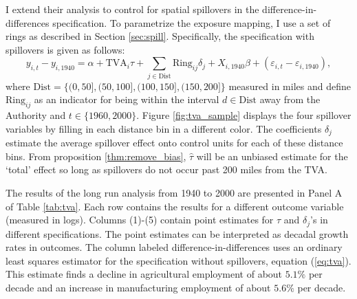 \documentclass[11pt]{article}
\begin{document}
I extend their analysis to control for spatial spillovers in the difference-in-differences specification. To parametrize the exposure mapping, I use a set of rings as described in Section \ref{sec:spill}. Specifically, 
the specification with spillovers is given as follows:  
\begin{equation}\label{eq:tva_spillover}
    y_{i, t} - y_{i, 1940} = \alpha + \text{TVA}_i \tau + \sum_{j \in \text{Dist}} \text{Ring}_{ij} \delta_j + X_{i, 1940} \beta + (\varepsilon_{i, t} - \varepsilon_{i, 1940}),
\end{equation} 
where $\text{Dist} = \{(0, 50], (50, 100], (100, 150], (150, 200]\}$ measured in miles and define $\text{Ring}_{ij}$ as an indicator for being within the interval $d \in \text{Dist}$ away from the Authority and $t \in \{1960, 2000\}$. Figure \ref{fig:tva_sample} displays the four spillover variables by filling in each distance bin in a different color. The coefficients $\delta_j$ estimate the average spillover effect onto control units for each of these distance bins. From proposition \ref{thm:remove_bias}, $\hat{\tau}$ will be an unbiased estimate for the `total' effect so long as spillovers do not occur past 200 miles from the TVA.

The results of the long run analysis from 1940 to 2000 are presented in Panel A of Table \ref{tab:tva}. Each row contains the results for a different outcome variable (measured in logs). Columns (1)-(5) contain point estimates for $\tau$ and $\delta_j$'s in different specifications. The point estimates can be interpreted as decadal growth rates in outcomes. The column labeled difference-in-differences uses an ordinary least squares estimator for the specification without spillovers, equation (\ref{eq:tva}). This estimate finds a decline in agricultural employment of about $5.1\%$ per decade and an increase in manufacturing employment of about $5.6\%$ per decade. 
\end{document}
